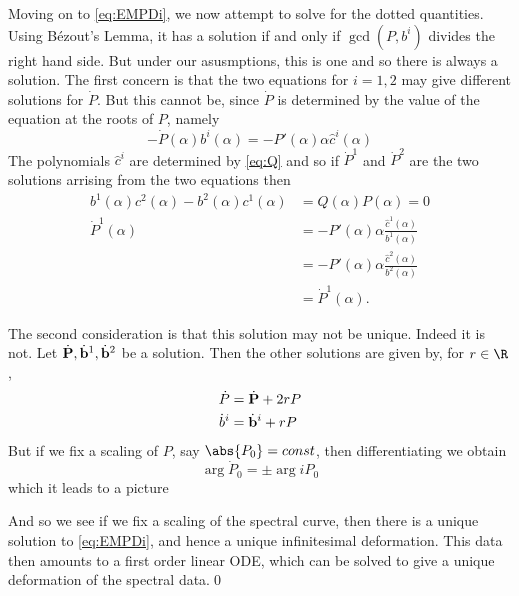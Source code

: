 \documentclass{article}
\begin{document}
Moving on to \eqref{eq:EMPDi}, we now attempt to solve for the dotted quantities. Using Bézout's Lemma, it has a solution if and only if $\gcd(P,b^i)$ divides the right hand side. But under our asusmptions, this is one and so there is always a solution. The first concern is that the two equations for $i=1,2$ may give different solutions for $\dot P$. But this cannot be, since $\dot P$ is determined by the value of the equation at the roots of $P$, namely
\[
-\dot P(\alpha) b^i(\alpha) = -P'(\alpha)\alpha\hat c^i(\alpha)
\]
The polynomials $\hat c^i$ are determined by \eqref{eq:Q} and so if $\dot P^1$ and $\dot P^2$ are the two solutions arrising from the two equations then
\begin{align*}
b^1(\alpha) c^2(\alpha) - b^2(\alpha) c^1(\alpha) &= Q(\alpha) P(\alpha) = 0 \\
\dot P^1(\alpha)
&= -P'(\alpha)\alpha \frac{\hat c^1(\alpha)}{b^1(\alpha)} \\
&= -P'(\alpha)\alpha \frac{\hat c^2(\alpha)}{b^2(\alpha)} \\
&= \dot P^1(\alpha).
\end{align*}

The second consideration is that this solution may not be unique. Indeed it is not. Let $\dot {\bf P}, \dot {\bf b}^1, \dot {\bf b}^2$ be a solution. Then the other solutions are given by, for $r\in \R$,
\begin{align*}
\dot P &= \dot {\bf P} + 2rP \\
\dot b^i &= \dot {\bf b}^i + rP \\
\end{align*}
But if we fix a scaling of $P$, say $\abs{P_0} = const$, then differentiating we obtain
\[
\arg \dot P_0 = \pm \arg i P_0
\]
which it leads to a picture

\begin{center}
\end{center}
And so we see if we fix a scaling of the spectral curve, then there is a unique solution to \eqref{eq:EMPDi}, and hence a unique infinitesimal deformation. This data then amounts to a first order linear ODE, which can be solved to give a unique deformation of the spectral data.\qed
\end{document}
